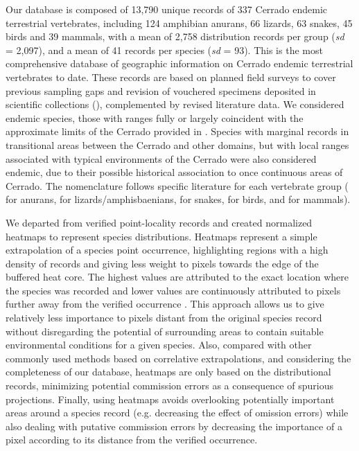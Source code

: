 \documentclass[12pt,openright,oneside,a4paper,english]{abntex2}
\begin{document}
Our database is composed of 13,790 unique records of 337 Cerrado endemic terrestrial vertebrates, including 124 amphibian anurans, 66 lizards, 63 snakes, 45 birds and 39 mammals, with a mean of 2,758 distribution records per group (\textit{sd} = 2,097), and a mean of 41 records per species (\textit{sd} = 93). This is the most comprehensive database of geographic information on Cerrado endemic terrestrial vertebrates to date. These records are based on planned field surveys to cover previous sampling gaps and revision of vouchered specimens deposited in scientific collections (\citealp[see details in][]{Nogueira2009, Valdujo2012, Nogueira2019, Carmignotto2022}), complemented by revised literature data. We considered endemic species, those with ranges fully or largely coincident with the approximate limits of the Cerrado provided in \citet{Dinerstein2017}. Species with marginal records in transitional areas between the Cerrado and other domains, but with local ranges associated with typical environments of the Cerrado were also considered endemic, due to their possible historical association to once continuous areas of Cerrado. The nomenclature follows specific literature for each vertebrate group (\citealp{Frost2020} for anurans, \citealp{Uetz2020} for lizards/amphisbaenians, \citealp{Nogueira2019} for snakes, \citealp{Pacheco2021birds} for birds, and \citealp{Abreu2021} for mammals).

We departed from verified point-locality records and created normalized heatmaps to represent species distributions. Heatmaps represent a simple extrapolation of a species point occurrence, highlighting regions with a high density of records and giving less weight to pixels towards the edge of the buffered heat core. The highest values are attributed to the exact location where the species was recorded and lower values are continuously attributed to pixels further away from the verified occurrence \citep{QGISUserGuide}. This approach allows us to give relatively less importance to pixels distant from the original species record without disregarding the potential of surrounding areas to contain suitable environmental conditions for a given species. Also, compared with other commonly used methods based on correlative extrapolations, and considering the completeness of our database, heatmaps are only based on the distributional records, minimizing potential commission errors as a consequence of spurious projections. Finally, using heatmaps avoids overlooking potentially important areas around a species record (e.g. decreasing the effect of omission errors) while also dealing with putative commission errors by decreasing the importance of a pixel according to its distance from the verified occurrence. 
\end{document}
